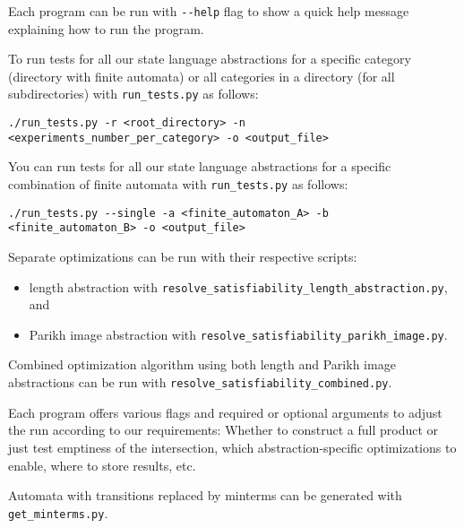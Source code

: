 Each program can be run with \texttt{-\--help} flag to show a quick help message explaining how to run the program.

To run tests for all our state language abstractions for a specific category (directory with finite automata) or all categories in a directory (for all subdirectories) with \texttt{run\_tests.py} as follows:

{
    \centering \footnotesize \texttt{./run\_tests.py -r <root\_directory> -n <experiments\_number\_per\_category> -o <output\_file>}
}

You can run tests for all our state language abstractions for a specific combination of finite automata with \texttt{run\_tests.py} as follows:

{
    \centering \footnotesize \texttt{./run\_tests.py -\--single -a <finite\_automaton\_A> -b <finite\_automaton\_B> -o <output\_file>}
}

Separate optimizations can be run with their respective scripts:
\begin{itemize}
    \item length abstraction with \texttt{resolve\_satisfiability\_length\_abstraction.py}, and
    \item Parikh image abstraction with \texttt{resolve\_satisfiability\_parikh\_image.py}.
\end{itemize}
Combined optimization algorithm using both length and Parikh image abstractions can be run with \texttt{resolve\_satisfiability\_combined.py}.

Each program offers various flags and required or optional arguments to adjust the run according to our requirements: Whether to construct a full product or just test emptiness of the intersection, which abstraction-specific optimizations to enable, where to store results, etc.

Automata with transitions replaced by minterms can be generated with \texttt{get\_minterms.py}.




